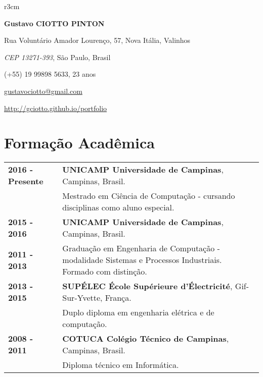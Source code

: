 \documentclass[10pt, a4paper]{article}
\author{Gustavo Ciotto Pinton}
\begin{document}
\pagestyle{empty}

\begin{wrapfigure}{r}{3cm}
\vspace{-20pt}
\begin{center}
\end{center}
\end{wrapfigure}

\textbf{\LARGE Gustavo CIOTTO PINTON}

Rua Voluntário Amador Lourenço, 57, Nova Itália, Valinhos

\textit{CEP 13271-393}, São Paulo, Brasil

(+55) 19 99898 5633, 23 anos

\url{gustavociotto@gmail.com}

\url{http://gciotto.github.io/portfolio}

\vspace{8pt}




\section{Formação Acadêmica}

\begin{tabular}{p{} p{}}

\textbf{2016 - Presente} & \textbf{UNICAMP Universidade de Campinas}, Campinas,
Brasil.
\\
& Mestrado em Ciência de Computação - cursando disciplinas como aluno especial.
\vspace{4pt}\\

\textbf{2015 - 2016} & \textbf{UNICAMP Universidade de Campinas}, Campinas,
Brasil.
\\
\textbf{2011 - 2013} & Graduação em Engenharia de Computação - modalidade
Sistemas e Processos Industriais. Formado com distinção. \vspace{4pt}\\

\textbf{2013 - 2015} & \textbf{SUPÉLEC  École Supérieure d'Électricité},
Gif-Sur-Yvette, França. \\
& Duplo diploma em engenharia elétrica e de computação. \vspace{4pt} \\

\textbf{2008 - 2011} & \textbf{COTUCA Colégio Técnico de Campinas}, Campinas,
Brasil. \\
& Diploma técnico em Informática. \\
\end{tabular}
\end{document}
